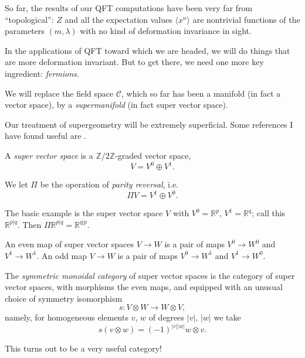 \documentclass[12pt,letterpaper,reqno]{article}
\numberwithin{equation}{section}
\newcommand{\cC}{\ensuremath{\mathcal C}}
\newcommand{\R}{\ensuremath{\mathbb R}}
\newcommand{\Z}{\ensuremath{\mathbb Z}}
\newcommand{\abs}[1]{\lvert#1\rvert}
\newcommand{\IP}[1]{\langle#1\rangle}
\newcommand{\ti}[1]{\textit{#1}}
\begin{document}
So far, the results of our QFT computations have been very far from
``topological'': $Z$ and all the expectation values
$\IP{x^n}$ are nontrivial functions of the parameters $(m,\lambda)$
with no kind of deformation invariance in sight.

In the applications of QFT toward which we are headed, 
we will do things that are more deformation
invariant. But to get there, we need one more key ingredient: \ti{fermions}.

We will replace the field space $\cC$, which so far has been a manifold
(in fact a vector space), by a \ti{supermanifold} (in fact super vector
space).

Our treatment of supergeometry will be extremely superficial. Some references
I have found useful are \cite{Deligne1999b,etingof,Witten2012,Zakharevich2017}.

\begin{defn} A \ti{super vector space} is a $\Z/2\Z$-graded vector space,
\begin{equation}
  V = V^0 \oplus V^1.
\end{equation}
\end{defn}

We let $\Pi$ be the operation of \ti{parity reversal}, i.e.
\begin{equation}
  \Pi V = V^1 \oplus V^0.
\end{equation}

\begin{example}The basic example is the super vector space $V$
with $V^0 = \R^p$, $V^1 = \R^q$; call this $\R^{p \vert q}$.
Then $\Pi \R^{p \vert q} = \R^{q \vert p}$.
\end{example}

\begin{defn} An even map of super vector spaces
$V \to W$ is a pair of maps $V^0 \to W^0$ and $V^1 \to W^1$.
An odd map $V \to W$ is a pair of maps $V^0 \to W^1$ and $V^1 \to W^0$.
\end{defn}

\begin{defn}
The \ti{symmetric monoidal category} of super vector spaces 
is the category of super vector spaces, with morphisms the even maps,
and equipped with an unusual choice of symmetry isomorphism
\begin{equation}
  s: V \otimes W \to W \otimes V,
\end{equation}
namely, for homogeneous elements $v$, $w$ of degrees $\abs{v}$, $\abs{w}$
we take
\begin{equation}
  s (v \otimes w) = (-1)^{\abs{v} \abs{w}} w \otimes v.
\end{equation}
\end{defn}
This turns out to be a very useful category!
\end{document}
